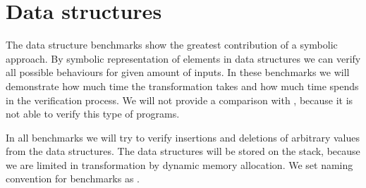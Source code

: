


\section{Data structures}

The data structure benchmarks show the greatest contribution of a symbolic
approach. By symbolic representation of elements in data structures we can
verify all possible behaviours for given amount of inputs. In these benchmarks
we will demonstrate how much time the transformation takes and how much time
\DIVINE spends in the verification process. We will not provide a comparison
with \SymDIVINE, because it is not able to verify this type of programs.

In all benchmarks we will try to verify insertions and deletions of arbitrary
values from the data structures. The data structures will be stored on the
stack, because we are limited in transformation by dynamic memory allocation.
We set naming convention for benchmarks as .

